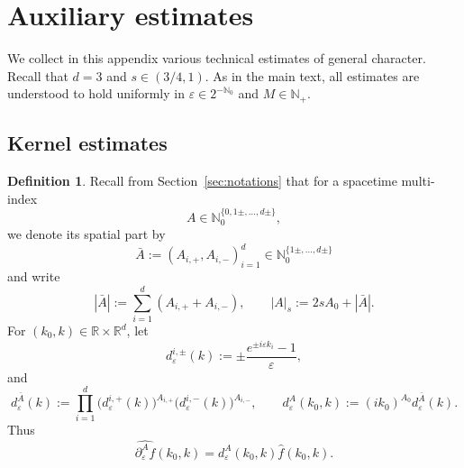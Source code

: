 \documentclass{article}
\numberwithin{equation}{section}
\newcommand{\assign}{:=}
\theoremstyle{plain}
\theoremstyle{definition}
\newtheorem{definition}[theorem]{Definition}
\begin{document}
\appendix\section{Auxiliary estimates}\label{app:technical}

We collect in this appendix various technical estimates of general character. Recall that $d=3$ and $s\in(3/4,1)$. As in the main text, all estimates are understood to hold uniformly in $\varepsilon \in 2^{-\mathbb{N}_0}$ and $M \in \mathbb{N}_+$.

\subsection{Kernel estimates}

\begin{definition}
	\label{def:derivatives}
	Recall from Section~\ref{sec:notations} that for a spacetime multi-index
	\[
	A \in \mathbb N_0^{\{ 0, 1\pm, \ldots, d\pm\}},
	\]
	we denote its spatial part by
	\[
	\bar A\assign (A_{i,+},A_{i,-})_{i=1}^d
	\in \mathbb N_0^{\{1\pm, \ldots, d\pm\}}
	\]
	and write
	\[
	|\bar A|
	\assign
	\sum_{i=1}^d(A_{i,+}+A_{i,-}),
	\qquad
	|A|_s
	\assign
	2sA_0+|\bar A|.
	\]
	For \((k_0,k)\in\mathbb R\times\mathbb R^d\), let
	\[
	d_\varepsilon^{i,\pm}(k)
	\assign
	\pm\frac{e^{\pm i\varepsilon k_i}-1}{\varepsilon},
	\]
	and
	\[
	d_\varepsilon^{\bar A}(k)
	\assign
	\prod_{i=1}^d
	\bigl(d_\varepsilon^{i,+}(k)\bigr)^{A_{i,+}}
	\bigl(d_\varepsilon^{i,-}(k)\bigr)^{A_{i,-}},
	\qquad
	d_\varepsilon^A(k_0,k)
	\assign
	(ik_0)^{A_0}d_\varepsilon^{\bar A}(k).
	\]
	Thus
	\[
	\widehat{\partial_\varepsilon^Af}(k_0,k)
	=
	d_\varepsilon^A(k_0,k)\hat f(k_0,k).
	\]
\end{definition}
\end{document}
